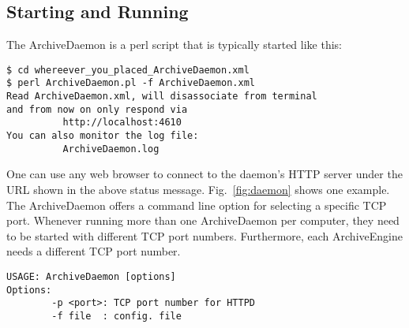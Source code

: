 \subsection{Starting and Running}
The ArchiveDaemon is a perl script that is typically started like this:

\begin{lstlisting}[keywordstyle=\sffamily]
$ cd whereever_you_placed_ArchiveDaemon.xml
$ perl ArchiveDaemon.pl -f ArchiveDaemon.xml
Read ArchiveDaemon.xml, will disassociate from terminal
and from now on only respond via
          http://localhost:4610
You can also monitor the log file:
          ArchiveDaemon.log
\end{lstlisting}

\noindent One can use any web browser to connect to the daemon's HTTP server
under the URL shown in the above status message. Fig.~\ref{fig:daemon}
shows one example. The ArchiveDaemon offers a command line option for
selecting a specific TCP port.
Whenever running more than one ArchiveDaemon per computer, they
need to be started with different TCP port numbers. Furthermore, each
ArchiveEngine needs a different TCP port number.
\begin{lstlisting}[keywordstyle=\sffamily]
USAGE: ArchiveDaemon [options] 
Options:
        -p <port>: TCP port number for HTTPD
        -f file  : config. file
\end{lstlisting}

